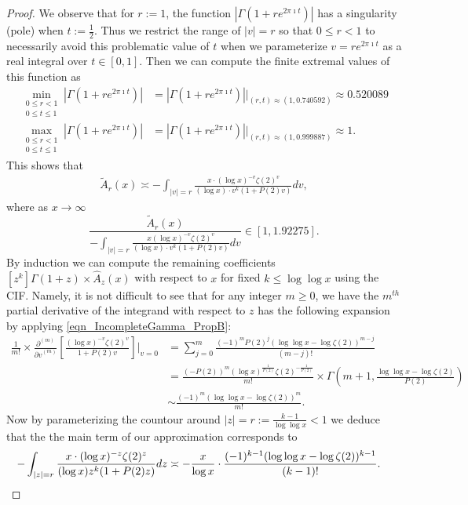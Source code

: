 \documentclass[11pt,reqno,a4letter]{article}
\numberwithin{figure}{section}
\numberwithin{table}{section}
\theoremstyle{plain}
\numberwithin{theorem}{section}
\theoremstyle{definition}
\begin{document}
\begin{proof}
We observe that for $r := 1$, the function $|\Gamma(1+re^{2\pi\imath t})|$ has a 
singularity (pole) when $t := \frac{1}{2}$. Thus we restrict the range of $|v| = r$ 
so that $0 \leq r < 1$ to necessarily avoid this problematic value of $t$ when 
we parameterize $v = r e^{2\pi\imath t}$ as a real integral over $t \in [0, 1]$. 
Then we can compute the finite extremal values of this function as 
\begin{align*} 
\min\limits_{\substack{0 \leq r < 1 \\ 0 \leq t \leq 1}} |\Gamma(1+re^{2\pi\imath t})| & = 
     |\Gamma(1+re^{2\pi\imath t})| \Biggr\rvert_{(r,t) \approx (1, 0.740592)} \approx 
     0.520089 \\ 
\max\limits_{\substack{0 \leq r < 1 \\ 0 \leq t \leq 1}} |\Gamma(1+re^{2\pi\imath t})| & = 
     |\Gamma(1+re^{2\pi\imath t})| \Biggr\rvert_{(r,t) \approx (1, 0.999887)} \approx 1. 
\end{align*} 
This shows that 
\begin{align} 
\label{eqn_WideTildeArx_CountourIntDef_v2} 
\widetilde{A}_r(x) \asymp 
     -\int_{|v|=r} \frac{x \cdot (\log x)^{-v} \zeta(2)^{v}}{(\log x) \cdot 
     v^{k} (1 + P(2) v)} dv, 
\end{align} 
where as $x \rightarrow \infty$ 
\[
\frac{\widetilde{A}_r(x)}{-\int_{|v|=r} \frac{x (\log x)^{-v} \zeta(2)^{v}}{(\log x) \cdot 
     v^{k} (1 + P(2) v)} dv} \in [1, 1.92275]. 
\] 
By induction we can compute the remaining coefficients 
$[z^k] \Gamma(1+z) \times \widehat{A}_z(x)$ with respect to 
$x$ for fixed $k \leq \log\log x$ using the CIF. 
Namely, it is not difficult to see that for any integer $m \geq 0$, 
we have the $m^{th}$ partial derivative of the integrand with respect to $z$ 
has the following expansion by applying 
\eqref{eqn_IncompleteGamma_PropB}: 
\begin{align*} 
\frac{1}{m!} \times \frac{\partial^{(m)}}{{\partial v}^{(m)}}\left[ 
     \frac{(\log x)^{-v} \zeta(2)^{v}}{1 + P(2) v}\right] \Biggr\rvert_{v=0} & = 
     \sum_{j=0}^{m} \frac{(-1)^{m} P(2)^{j} (\log\log x - \log\zeta(2))^{m-j}}{(m-j)!} \\ 
     & = 
     \frac{(-P(2))^{m} (\log x)^{\frac{1}{P(2)}} \zeta(2)^{-\frac{1}{P(2)}}}{m!} \times 
     \Gamma\left(m+1, \frac{\log\log x - \log\zeta(2)}{P(2)}\right) \\ 
     & \sim \frac{(-1)^m (\log\log x -\log\zeta(2))^{m}}{m!}. 
\end{align*} 
Now by parameterizing the countour around $|z| = r := \frac{k-1}{\log\log x} < 1$ we 
deduce that the the main term of our approximation corresponds to 
\begin{align*} 
-\int_{|z|=r} \frac{x \cdot (\log x)^{-z} \zeta(2)^{z}}{(\log x) z^{k} (1 + P(2) z)} dz & \asymp 
     -\frac{x}{\log x} \cdot \frac{(-1)^{k-1} (\log\log x - \log\zeta(2))^{k-1}}{(k-1)!}. 
     \qedhere 
\end{align*} 
\end{proof} 
\end{document}
